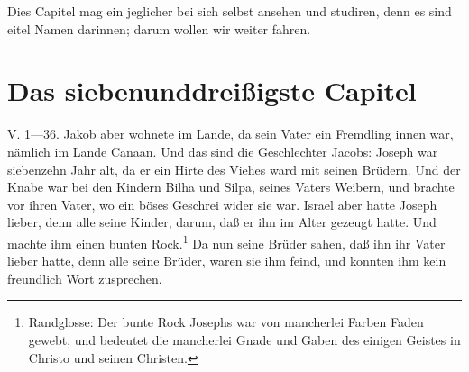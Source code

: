 Dies Capitel mag ein jeglicher bei sich selbst ansehen und studiren, denn es sind eitel Namen darinnen; darum wollen wir weiter fahren.

\section{Das siebenunddreißigste Capitel}
V. 1—36. Jakob aber wohnete im Lande, da sein Vater ein Fremdling innen war, nämlich im Lande Canaan. Und das sind die Geschlechter Jacobs: Joseph war siebenzehn Jahr alt, da er ein Hirte des Viehes ward mit seinen Brüdern. Und der Knabe war bei den Kindern Bilha und Silpa, seines Vaters Weibern, und brachte vor ihren Vater, wo ein böses Geschrei wider sie war. Israel aber hatte Joseph lieber, denn alle seine Kinder, darum, daß er ihn im Alter gezeugt hatte. Und machte ihm einen bunten Rock.\footnote{Randglosse: Der bunte Rock Josephs war von mancherlei Farben Faden gewebt, und bedeutet die mancherlei Gnade und Gaben des einigen Geistes in Christo und seinen Christen.} Da nun seine Brüder sahen, daß ihn ihr Vater lieber hatte, denn alle seine Brüder, waren sie ihm feind, und konnten ihm kein freundlich Wort zusprechen.

